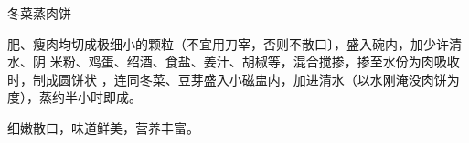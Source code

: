 \begin{recipe}{冬菜蒸肉饼}

\ingredients


\cooking

肥、瘦肉均切成极细小的颗粒（不宜用刀宰，否则不散口〕，盛入碗内，加少许清水、阴
米粉、鸡蛋、绍酒、食盐、姜汁、胡椒等，混合搅掺，掺至水份为肉吸收时，制成圆饼状
，连同冬菜、豆芽盛入小磁盅内，加进清水（以水刚淹没肉饼为度），蒸约半小时即成。

\notes

细嫩散口，味道鲜美，营养丰富。

\end{recipe}

